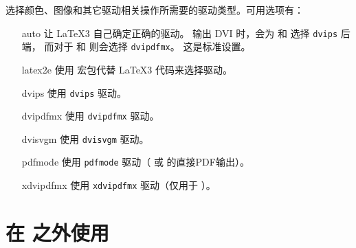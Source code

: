 \documentclass[full]{l3doc}
\begin{document}
%
选择颜色、图像和其它驱动相关操作所需要的驱动类型。可用选项有：
\begin{itemize}[font = \texttt]
    \item[auto] 让 \LaTeX3 自己确定正确的驱动。
    输出 DVI 时，会为 \pdfTeX{} 和 \LuaTeX{} 选择 \texttt{dvips} 后端，
    而对于 \pTeX{} 和 \upTeX{} 则会选择 \texttt{dvipdfmx}。
    这是标准设置。
    \item[latex2e] 使用  宏包代替 \LaTeX3 代码来选择驱动。
    \item[dvips] 使用 \texttt{dvips} 驱动。
    \item[dvipdfmx] 使用 \texttt{dvipdfmx} 驱动。
    \item[dvisvgm] 使用 \texttt{dvisvgm} 驱动。
    \item[pdfmode] 使用 \texttt{pdfmode} 驱动（\pdfTeX{} 或 \LuaTeX{} 的直接PDF输出）。
    \item[xdvipdfmx] 使用 \texttt{xdvipdfmx} 驱动（仅用于 \XeTeX{}）。
\end{itemize}

%
\section{在 \LaTeXe{} 之外使用 }
\end{document}
